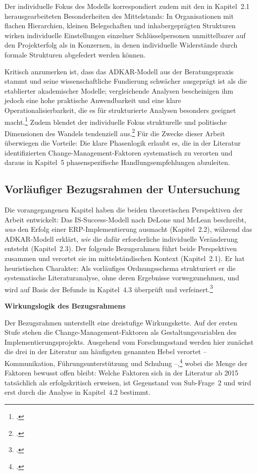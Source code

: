 Der individuelle Fokus des Modells korrespondiert zudem mit den in Kapitel~2.1 herausgearbeiteten Besonderheiten des Mittelstands: In Organisationen mit flachen Hierarchien, kleinen Belegschaften und inhabergepr\"agten Strukturen wirken individuelle Einstellungen einzelner Schl\"usselpersonen unmittelbarer auf den Projekterfolg als in Konzernen, in denen individuelle Widerst\"ande durch formale Strukturen abgefedert werden k\"onnen.

Kritisch anzumerken ist, dass das ADKAR-Modell aus der Beratungspraxis stammt und seine wissenschaftliche Fundierung schw\"acher ausgepr\"agt ist als die etablierter akademischer Modelle; vergleichende Analysen bescheinigen ihm jedoch eine hohe praktische Anwendbarkeit und eine klare Operationalisierbarkeit, die es f\"ur strukturierte Analysen besonders geeignet macht.\footcite[Vgl.][S.~129--130]{galli2018} Zudem blendet der individuelle Fokus strukturelle und politische Dimensionen des Wandels tendenziell aus.\footcite[Vgl.][S.~376--378]{by2005} F\"ur die Zwecke dieser Arbeit \"uberwiegen die Vorteile: Die klare Phasenlogik erlaubt es, die in der Literatur identifizierten Change-Management-Faktoren systematisch zu verorten und daraus in Kapitel~5 phasenspezifische Handlungsempfehlungen abzuleiten.

\subsection{Vorl\"aufiger Bezugsrahmen der Untersuchung}

Die vorangegangenen Kapitel haben die beiden theoretischen Perspektiven der Arbeit entwickelt: Das IS-Success-Modell nach DeLone und McLean beschreibt, \textit{was} den Erfolg einer ERP-Implementierung ausmacht (Kapitel~2.2), w\"ahrend das ADKAR-Modell erkl\"art, \textit{wie} die daf\"ur erforderliche individuelle Ver\"anderung entsteht (Kapitel~2.3). Der folgende Bezugsrahmen f\"uhrt beide Perspektiven zusammen und verortet sie im mittelst\"andischen Kontext (Kapitel~2.1). Er hat heuristischen Charakter: Als vorl\"aufiges Ordnungsschema strukturiert er die systematische Literaturanalyse, ohne deren Ergebnisse vorwegzunehmen, und wird auf Basis der Befunde in Kapitel~4.3 \"uberpr\"uft und verfeinert.\footcite[Vgl.][S.~17--20]{kubicek1977}

\textbf{Wirkungslogik des Bezugsrahmens}

Der Bezugsrahmen unterstellt eine dreistufige Wirkungskette. Auf der ersten Stufe stehen die Change-Management-Faktoren als Gestaltungsvariablen des Implementierungsprojekts. Ausgehend vom Forschungsstand werden hier zun\"achst die drei in der Literatur am h\"aufigsten genannten Hebel verortet -- Kommunikation, F\"uhrungsunterst\"utzung und Schulung --,\footcites[Vgl.][S.~285]{nah2001}[][S.~7--8]{butarbutar2023} wobei die Menge der Faktoren bewusst offen bleibt: Welche Faktoren sich in der Literatur ab 2015 tats\"achlich als erfolgskritisch erweisen, ist Gegenstand von Sub-Frage~2 und wird erst durch die Analyse in Kapitel~4.2 bestimmt.

